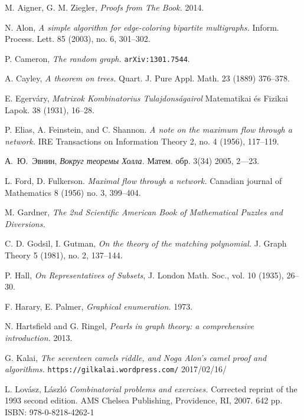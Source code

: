 \begin{thebibliography}{52}

 M. Aigner, G. M. Ziegler,  \emph{Proofs from The Book.} 2014.

 N. Alon,
\emph{A simple algorithm for edge-coloring bipartite multigraphs.}
Inform. Process. Lett. 85 (2003), no. 6, 301--302. 

 P. Cameron,   \emph{The random graph.} \texttt{arXiv:1301.7544}.

A. Cayley, \emph{A theorem on trees.} Quart. J. Pure Appl. Math. 23 (1889) 376--378.


E. Egerv\'ary, 
\emph{Matrixok Kombinatorius Tulajdons\'agairol}
Matematikai \'es Fizikai Lapok. 38 (1931), 16--28.

 P. Elias, A. Feinstein, and C. Shannon. 
\emph{A note on the maximum flow through a network.}
IRE Transactions on Information Theory 2, no. 4 (1956), 117--119.

 \begin{otherlanguage}{russian}
А.~Ю.~Эвнин,
\emph{Вокруг теоремы Холла.} Матем. обр. 3(34) 2005, 2---23.
 \end{otherlanguage}

 L. Ford, D. Fulkerson. 
\emph{Maximal flow through a network.} 
Canadian journal of Mathematics 8 (1956) no. 3, 399--404.

 M. Gardner, \emph{The 2nd Scientific American Book of Mathematical Puzzles and Diversions.}

C. D. Godsil, I. Gutman, 
\emph{On the theory of the matching polynomial.}
J. Graph Theory 5 (1981), no. 2, 137–144.

P. Hall, 
\emph{On Representatives of Subsets}, 
J. London Math. Soc., vol. 10 (1935), 26--30.

 F. Harary, E. Palmer, 
\emph{Graphical enumeration.} 1973.

 N. Hartsfield and  G. Ringel, 
\emph{Pearls in graph theory: a comprehensive introduction.} 2013.

 G. Kalai, 
\emph{The seventeen camels riddle, and Noga Alon’s camel proof and algorithms.}
\texttt{https://gilkalai.wordpress.com/} 2017/02/16/

 L. Lov\'asz, L\'aszl\'o \emph{Combinatorial problems and exercises.} Corrected reprint of the 1993 second edition. AMS Chelsea Publishing, Providence, RI, 2007. 642 pp. ISBN: 978-0-8218-4262-1


\end{thebibliography}
